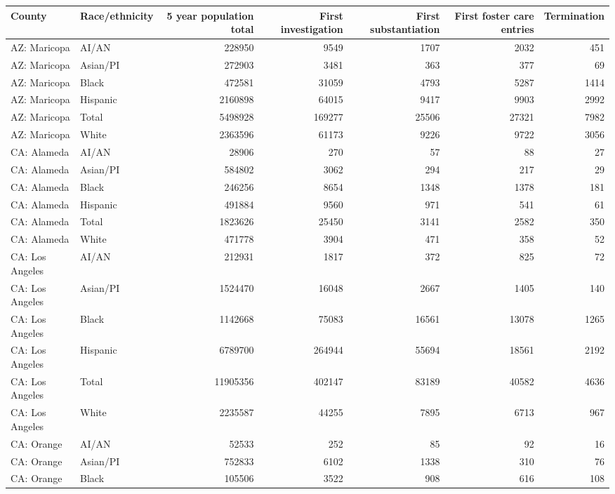 \begin{table}[ht]
\centering
\begin{tabular}{llrrrrr}
  \hline
County & Race/ethnicity & 5 year population total & First investigation & First substantiation & First foster care entries & Termination \\ 
  \hline
AZ: Maricopa & AI/AN & 228950 & 9549 & 1707 & 2032 & 451 \\ 
  AZ: Maricopa & Asian/PI & 272903 & 3481 & 363 & 377 & 69 \\ 
  AZ: Maricopa & Black & 472581 & 31059 & 4793 & 5287 & 1414 \\ 
  AZ: Maricopa & Hispanic & 2160898 & 64015 & 9417 & 9903 & 2992 \\ 
  AZ: Maricopa & Total & 5498928 & 169277 & 25506 & 27321 & 7982 \\ 
  AZ: Maricopa & White & 2363596 & 61173 & 9226 & 9722 & 3056 \\ 
  CA: Alameda & AI/AN & 28906 & 270 & 57 & 88 & 27 \\ 
  CA: Alameda & Asian/PI & 584802 & 3062 & 294 & 217 & 29 \\ 
  CA: Alameda & Black & 246256 & 8654 & 1348 & 1378 & 181 \\ 
  CA: Alameda & Hispanic & 491884 & 9560 & 971 & 541 & 61 \\ 
  CA: Alameda & Total & 1823626 & 25450 & 3141 & 2582 & 350 \\ 
  CA: Alameda & White & 471778 & 3904 & 471 & 358 & 52 \\ 
  CA: Los Angeles & AI/AN & 212931 & 1817 & 372 & 825 & 72 \\ 
  CA: Los Angeles & Asian/PI & 1524470 & 16048 & 2667 & 1405 & 140 \\ 
  CA: Los Angeles & Black & 1142668 & 75083 & 16561 & 13078 & 1265 \\ 
  CA: Los Angeles & Hispanic & 6789700 & 264944 & 55694 & 18561 & 2192 \\ 
  CA: Los Angeles & Total & 11905356 & 402147 & 83189 & 40582 & 4636 \\ 
  CA: Los Angeles & White & 2235587 & 44255 & 7895 & 6713 & 967 \\ 
  CA: Orange & AI/AN & 52533 & 252 & 85 & 92 & 16 \\ 
  CA: Orange & Asian/PI & 752833 & 6102 & 1338 & 310 & 76 \\ 
  CA: Orange & Black & 105506 & 3522 & 908 & 616 & 108 \\ 

\end{tabular}
\end{table}
